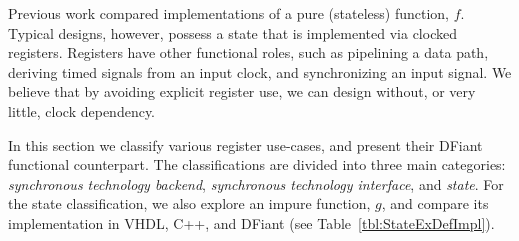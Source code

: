 %        
%        
%        

Previous work \cite{Port2017} compared implementations of a pure (stateless) function, $f$. Typical designs, however, possess a state that is implemented via clocked registers. Registers have other functional roles, such as pipelining a data path, deriving timed signals from an input clock, and synchronizing an input signal. We believe that by avoiding explicit register use, we can design without, or very little, clock dependency. 

In this section we classify various register use-cases, and present their DFiant functional counterpart. The classifications are divided into three main categories: \textit{synchronous technology backend}, \textit{synchronous technology interface}, and \textit{state}. For the state classification, we also explore an impure function, $g$, and compare its implementation in VHDL, C++, and DFiant (see Table~\ref{tbl:StateExDefImpl}).


